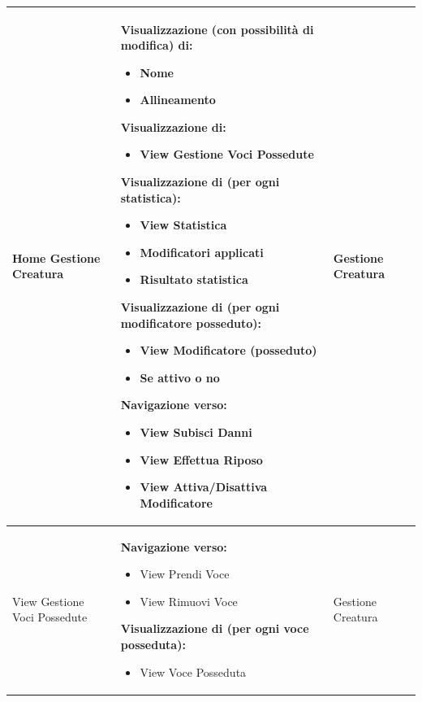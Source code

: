 \documentclass[a4paper, 11pt]{article}
\begin{document}
\begin{adjustwidth}{-1.5cm}{-1.5cm}
\begin{center}
\begin{longtable}{|p{5cm}|p{5cm}|p{5cm}|}
        Home Gestione Creatura & 
        \textbf{Visualizzazione (con possibilità di modifica) di:}
        \begin{itemize}
            \item Nome
            \item Allineamento
        \end{itemize}
        \textbf{Visualizzazione di:}
        \begin{itemize}
            \item View Gestione Voci Possedute
        \end{itemize}
        \textbf{Visualizzazione di (per ogni statistica):}
        \begin{itemize}
            \item View Statistica 
            \item Modificatori applicati
            \item Risultato statistica
        \end{itemize}
        \textbf{Visualizzazione di (per ogni modificatore posseduto):}
        \begin{itemize}
            \item View Modificatore (posseduto)
            \item Se attivo o no
        \end{itemize}
        \textbf{Navigazione verso:} 
        \begin{itemize}
            \item View Subisci Danni
            \item View Effettua Riposo
            \item View Attiva/Disattiva Modificatore
        \end{itemize} & Gestione Creatura \\ \hline
        
        View Gestione Voci Possedute & \textbf{Navigazione verso:}
        \begin{itemize}
            \item View Prendi Voce
            \item View Rimuovi Voce
        \end{itemize}
        \textbf{Visualizzazione di (per ogni voce posseduta):}
        \begin{itemize}
            \item View Voce Posseduta
        \end{itemize} & Gestione Creatura \\ \hline
        

\end{longtable}
\end{center}
\end{adjustwidth}
\end{document}
